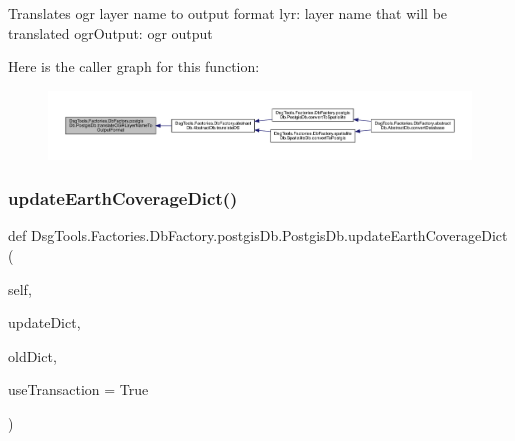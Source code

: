 \begin{DoxyVerb}Translates ogr layer name to output format
lyr: layer name that will be translated
ogrOutput: ogr output
\end{DoxyVerb}
 Here is the caller graph for this function\+:
\nopagebreak
\begin{figure}[H]
\begin{center}
\leavevmode
\includegraphics[width=350pt]{class_dsg_tools_1_1_factories_1_1_db_factory_1_1postgis_db_1_1_postgis_db_a195d2a88eac9832fc26a5a2360170c64_icgraph}
\end{center}
\end{figure}
\mbox{\label{class_dsg_tools_1_1_factories_1_1_db_factory_1_1postgis_db_1_1_postgis_db_ae61407d11e5b719bda0b1fbc8fc3a126}} 
\subsubsection{\texorpdfstring{update\+Earth\+Coverage\+Dict()}{updateEarthCoverageDict()}}
{\footnotesize\ttfamily def Dsg\+Tools.\+Factories.\+Db\+Factory.\+postgis\+Db.\+Postgis\+Db.\+update\+Earth\+Coverage\+Dict (\begin{DoxyParamCaption}\item[{}]{self,  }\item[{}]{update\+Dict,  }\item[{}]{old\+Dict,  }\item[{}]{use\+Transaction = {\ttfamily True} }\end{DoxyParamCaption})}

